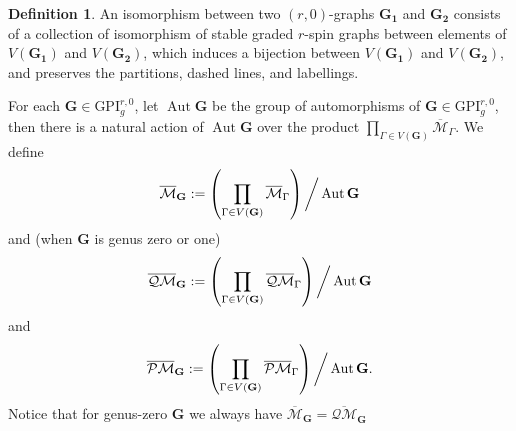 \documentclass[11pt]{amsart}
\theoremstyle{definition}
\newtheorem{dfn}[dummy]{Definition}
\theoremstyle{remark}
\newcommand{\oPMb}{{\overline{\mathcal{PM}}}}
\newcommand{\oQMb}{{\overline{\mathcal{QM}}}}
\newcommand{\<}{\left<}
\renewcommand{\>}{\right>}
\numberwithin{equation}{section}
\def\Mbar{{\overline{\mathcal M}}}
\def\GPI{{\text{GPI}}}
\begin{document}
\begin{dfn}
    An isomorphism between two $(r,0)$-graphs $\mathbf{G_1}$ and $\mathbf{G_2}$ consists of a collection of isomorphism of stable graded $r$-spin graphs between elements of $V(\mathbf{G_1})$ and $V(\mathbf{G_2})$, which induces a bijection between $V(\mathbf{G_1})$ and $V(\mathbf{G_2})$, and preserves the partitions, dashed lines, and %
labellings.
\end{dfn}

For each %
$\mathbf{G}\in \GPI^{r,0}_g$, let $\operatorname{Aut} \mathbf{G}$ be the group of automorphisms of %
$\mathbf{G}\in \GPI^{r,0}_g$, then there %
is a natural action of $\operatorname{Aut} \mathbf{G}$ over the product $\prod_{\Gamma\in V(\mathbf{G})} \Mbar_\Gamma$. We define 
$$
\Mbar_\mathbf{G}:=\left(\prod_{\Gamma\in V(\mathbf{G})} \Mbar_\Gamma\right)\bigg\slash \operatorname{Aut} \mathbf{G}
$$
and (when $\mathbf{G}$ is genus zero or one)
$$
\oQMb_\mathbf{G}:=\left(\prod_{\Gamma\in V(\mathbf{G})} \oQMb_\Gamma\right)\bigg\slash \operatorname{Aut} \mathbf{G}
$$
and
$$
\oPMb_\mathbf{G}:=\left(\prod_{\Gamma\in V(\mathbf{G})} \oPMb_\Gamma\right)\bigg\slash \operatorname{Aut} \mathbf{G}.
$$
Notice that for %
genus-zero $\mathbf{G}$ we %
always %
have  $\Mbar_\mathbf{G}=\oQMb_\mathbf{G}$
\end{document}
